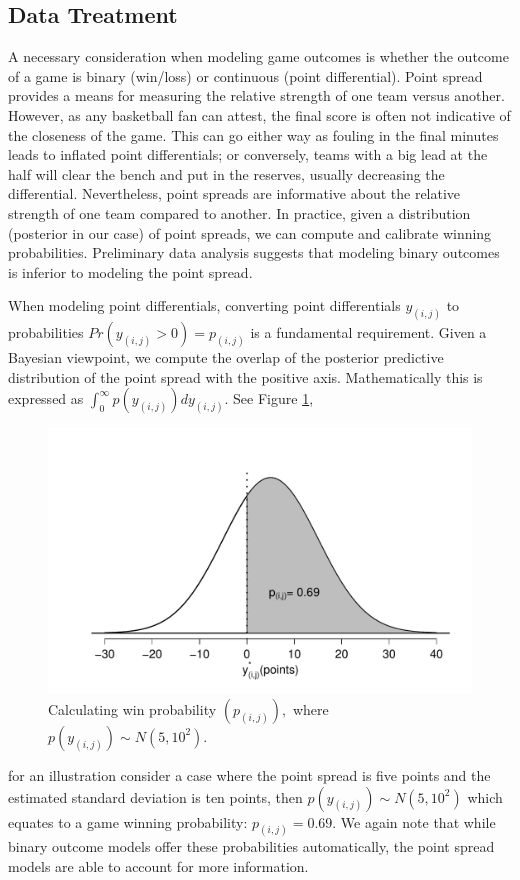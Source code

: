\documentclass[letterpaper,12pt]{article}
\begin{document}
\subsection{Data Treatment}
A necessary consideration when modeling game outcomes is whether the outcome of a game is binary (win/loss) or continuous (point differential). Point spread provides a means for measuring the relative strength of one team versus another. However, as any basketball fan can attest, the final score is often not indicative of the closeness of the game. This can go either way as fouling in the final minutes leads to inflated point differentials; or conversely, teams with a big lead at the half will clear the bench and put in the reserves,  usually decreasing the differential. Nevertheless, point spreads are informative about the relative strength of one team compared to another. In practice, given a distribution (posterior in our case) of point spreads, we can compute and calibrate winning probabilities. Preliminary data analysis suggests that modeling binary outcomes is inferior to modeling the point spread. 

When modeling point differentials, converting point differentials $y_{(i,j)}$ to probabilities $Pr(y_{(i,j)}>0)=p_{(i,j)}$ is a fundamental requirement. Given a Bayesian viewpoint, we compute the overlap of the posterior predictive distribution of the point spread with the positive axis. Mathematically this is expressed as $\int_0^\infty p(y_{(i,j)})dy_{(i,j)}$. See Figure \ref{fig:winprob}, \begin{figure}[h!]
\centering
\includegraphics[width=.7\textwidth]{WinProb2.pdf}
\caption{Calculating win probability $(p_{(i,j)}),$ where $p(y_{(i,j)}) \sim N(5,10^2)$.}
\label{fig:winprob}
\end{figure} 
for an illustration consider a case where the point spread is five points and the estimated standard deviation is ten points, then $p(y_{(i,j)}) \sim N(5,10^2)$ which equates to a game winning probability: $p_{(i,j)}=0.69$.
We again note that while binary outcome models offer these probabilities automatically, the point spread models are able to account for more information. 
\end{document}
